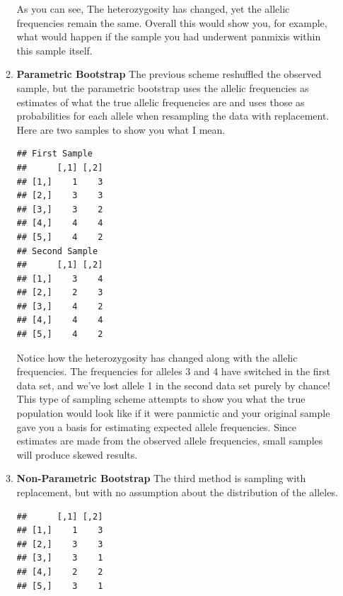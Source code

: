 \documentclass[letterpaper]{article}\usepackage[]{graphicx}\usepackage[]{color}
\makeatletter
\newenvironment{kframe}{%
 \def\at@end@of@kframe{}%
 \ifinner\ifhmode%
  \def\at@end@of@kframe{\end{minipage}}%
  \begin{minipage}{\columnwidth}%
 \fi\fi%
 \def\FrameCommand##1{\hskip\@totalleftmargin \hskip-\fboxsep
 \colorbox{shadecolor}{##1}\hskip-\fboxsep
     \hskip-\linewidth \hskip-\@totalleftmargin \hskip\columnwidth}%
 \MakeFramed {\advance\hsize-\width
   \@totalleftmargin\z@ \linewidth\hsize
   \@setminipage}}%
 {\par\unskip\endMakeFramed%
 \at@end@of@kframe}
\newenvironment{knitrout}{}{} %
\makeatother
\begin{document}
\begin{itemize}
\begin{enumerate}
As you can see, The heterozygosity has changed, yet the allelic frequencies remain the same. Overall this would show you, for example, what would happen if the sample you had underwent panmixis within this sample itself. 
    \item \textbf{Parametric Bootstrap} The previous scheme reshuffled the observed sample, but the parametric bootstrap uses the allelic frequencies as estimates of what the true allelic frequencies are and uses those as probabilities for each allele when resampling the data with replacement. Here are two samples to show you what I mean.
\begin{knitrout}\footnotesize
{}\color{fgcolor}\begin{kframe}
\begin{verbatim}
## First Sample
##      [,1] [,2]
## [1,]    1    3
## [2,]    3    3
## [3,]    3    2
## [4,]    4    4
## [5,]    4    2
## Second Sample
##      [,1] [,2]
## [1,]    3    4
## [2,]    2    3
## [3,]    4    2
## [4,]    4    4
## [5,]    4    2
\end{verbatim}
\end{kframe}
\end{knitrout}


Notice how the heterozygosity has changed along with the allelic frequencies. The frequencies for alleles 3 and 4 have switched in the first data set, and we've lost allele 1 in the second data set purely by chance! This type of sampling scheme attempts to show you what the true population would look like if it were panmictic and your original sample gave you a basis for estimating expected allele frequencies. Since estimates are made from the observed allele frequencies, small samples will produce skewed results.
    \item \textbf{Non-Parametric Bootstrap} The third method is sampling with replacement, but with no assumption about the distribution of the alleles. 
\begin{knitrout}\footnotesize
{}\color{fgcolor}\begin{kframe}
\begin{verbatim}
##      [,1] [,2]
## [1,]    1    3
## [2,]    3    3
## [3,]    3    1
## [4,]    2    2
## [5,]    3    1
\end{verbatim}
\end{kframe}
\end{knitrout}


\end{enumerate}
\end{itemize}
\end{document}
